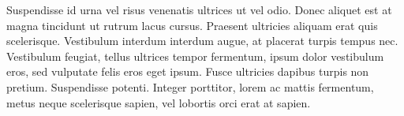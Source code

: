 Suspendisse id urna vel risus venenatis ultrices ut vel odio. Donec aliquet est at magna tincidunt ut rutrum lacus cursus. Praesent ultricies aliquam erat quis scelerisque. Vestibulum interdum interdum augue, at placerat turpis tempus nec. Vestibulum feugiat, tellus ultrices tempor fermentum, ipsum dolor vestibulum eros, sed vulputate felis eros eget ipsum. Fusce ultricies dapibus turpis non pretium. Suspendisse potenti. Integer porttitor, lorem ac mattis fermentum, metus neque scelerisque sapien, vel lobortis orci erat at sapien. 